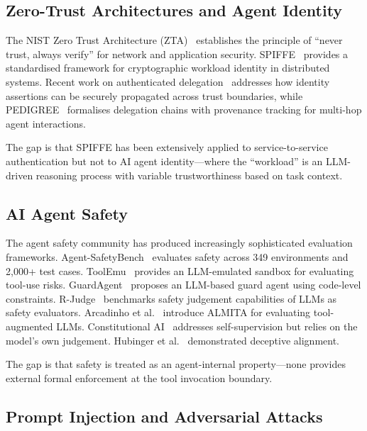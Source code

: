 \documentclass[10pt,a4paper,twocolumn]{article}
\begin{document}
\subsection{Zero-Trust Architectures and Agent Identity}
\label{sec:zero_trust}

The NIST Zero Trust Architecture (ZTA)~\cite{rose2020zero} establishes the principle of ``never trust, always verify'' for network and application security. SPIFFE~\cite{spiffe2022} provides a standardised framework for cryptographic workload identity in distributed systems. Recent work on authenticated delegation~\cite{south2025authenticated} addresses how identity assertions can be securely propagated across trust boundaries, while PEDIGREE~\cite{rampalli2026pedigree} formalises delegation chains with provenance tracking for multi-hop agent interactions.

The gap is that SPIFFE has been extensively applied to service-to-service authentication but not to AI agent identity---where the ``workload'' is an LLM-driven reasoning process with variable trustworthiness based on task context.

\subsection{AI Agent Safety}
\label{sec:agent_safety}

The agent safety community has produced increasingly sophisticated evaluation frameworks. Agent-SafetyBench~\cite{zhang2024agentsafetybench} evaluates safety across 349 environments and 2,000+ test cases. ToolEmu~\cite{ruan2024toolemu} provides an LLM-emulated sandbox for evaluating tool-use risks. GuardAgent~\cite{xiang2024guardagent} proposes an LLM-based guard agent using code-level constraints. R-Judge~\cite{yuan2024rjudge} benchmarks safety judgement capabilities of LLMs as safety evaluators. Arcadinho et al.~\cite{arcadinho2024almita} introduce ALMITA for evaluating tool-augmented LLMs. Constitutional AI~\cite{bai2022constitutional} addresses self-supervision but relies on the model's own judgement. Hubinger et al.~\cite{hubinger2024sleeper} demonstrated deceptive alignment.

The gap is that safety is treated as an agent-internal property---none provides external formal enforcement at the tool invocation boundary.

\subsection{Prompt Injection and Adversarial Attacks}
\label{sec:prompt_injection}
\end{document}
